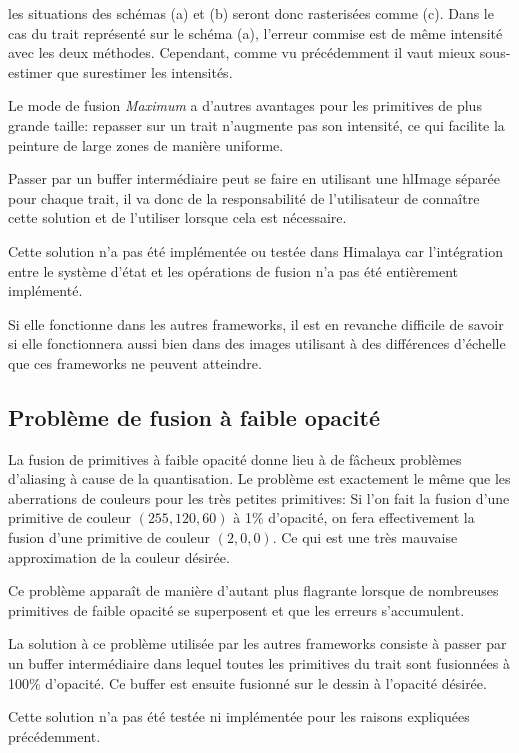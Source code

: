 			les situations des schémas (a) et (b) seront donc rasterisées comme (c). Dans le cas du trait représenté sur le schéma (a), 
			l'erreur commise est de même intensité avec les deux méthodes. Cependant, comme vu précédemment il vaut mieux
			sous-estimer que surestimer les intensités. 

			Le mode de fusion \emph{Maximum} a d'autres avantages pour les primitives de plus grande taille: repasser 
			sur un trait n'augmente pas son intensité, ce qui facilite la peinture de large zones de manière uniforme. 

			Passer par un buffer intermédiaire peut se faire en utilisant une hlImage séparée pour chaque trait, il va
			donc de la responsabilité de l'utilisateur de connaître cette solution et de l'utiliser lorsque cela
			est nécessaire. 
			
			Cette solution n'a pas été implémentée ou testée dans Himalaya car l'intégration entre le système d'état et
			les opérations de fusion n'a pas été entièrement implémenté. 
			
			Si elle fonctionne dans les autres frameworks, il est en revanche difficile de savoir si elle fonctionnera 
			aussi bien dans des images utilisant à des différences d'échelle que ces frameworks ne peuvent atteindre. 
			
		\subsection{\label{fopac}Problème de fusion à faible opacité}
			La fusion de primitives à faible opacité donne lieu à de fâcheux problèmes d'aliasing à cause de la quantisation.
			Le problème est exactement le même que les aberrations de couleurs pour les très petites primitives: Si l'on
			fait la fusion d'une primitive de couleur $(255,120,60)$ à 1\% d'opacité, on fera effectivement la fusion d'une
			primitive de couleur $(2,0,0)$. Ce qui est une très mauvaise approximation de la couleur désirée. 
			
			Ce problème apparaît de manière d'autant plus flagrante lorsque de nombreuses primitives de faible opacité se
			superposent et que les erreurs s'accumulent. 

			La solution à ce problème utilisée par les autres frameworks consiste à passer par un buffer intermédiaire 
			dans lequel toutes les primitives du trait sont fusionnées à 100\% d'opacité. Ce buffer est ensuite fusionné
			sur le dessin à l'opacité désirée. 

			Cette solution n'a pas été testée ni implémentée pour les raisons expliquées précédemment.  

